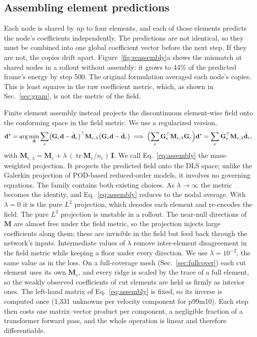 \documentclass[conf]{new-aiaa}
\newcommand{\dvec}{\mathbf{d}}
\newcommand{\dhat}{\hat{\mathbf{d}}}
\begin{document}
\subsection{Assembling element predictions}
\label{sec:assembly}
Each node is shared by up to four elements, and each of those elements predicts the node's coefficients independently. The predictions are not identical, so they must be combined into one global coefficient vector before the next step. If they are not, the copies drift apart. Figure~\ref{fig:reassembly}a shows the mismatch at shared nodes in a rollout without assembly: it grows to 44\% of the predicted frame's energy by step 500. The original formulation averaged each node's copies. This is least squares in the raw coefficient metric, which, as shown in Sec.~\ref{sec:gram}, is not the metric of the field.

Finite element assembly instead projects the discontinuous element-wise field onto the conforming space in the field metric. We use a regularized version,
\begin{equation}
  \dvec^{\star}=\arg\min_{\dvec}\sum_{e}\bigl(\mathbf{G}_e\dvec-\dhat_e\bigr)^{\top}\mathbf{M}_{e,\lambda}\bigl(\mathbf{G}_e\dvec-\dhat_e\bigr)
  \;\Longrightarrow\;
  \Bigl(\sum_{e}\mathbf{G}_e^{\top}\mathbf{M}_{e,\lambda}\mathbf{G}_e\Bigr)\dvec^{\star}=\sum_{e}\mathbf{G}_e^{\top}\mathbf{M}_{e,\lambda}\dhat_e,
  \label{eq:assembly}
\end{equation}
with $\mathbf{M}_{e,\lambda}=\mathbf{M}_e+\lambda\,(\operatorname{tr}\mathbf{M}_e/n_e)\,\mathbf{I}$. We call Eq.~\eqref{eq:assembly} the mass-weighted projection. It projects the predicted field onto the DLS space; unlike the Galerkin projection of POD-based reduced-order models, it involves no governing equations. The family contains both existing choices. As $\lambda\rightarrow\infty$ the metric becomes the identity, and Eq.~\eqref{eq:assembly} reduces to the nodal average. With $\lambda=0$ it is the pure $L^2$ projection, which decodes each element and re-encodes the field. The pure $L^2$ projection is unstable in a rollout. The near-null directions of $\mathbf{M}$ are almost free under the field metric, so the projection injects large coefficients along them; these are invisible in the field but feed back through the network's inputs. Intermediate values of $\lambda$ remove inter-element disagreement in the field metric while keeping a floor under every direction. We use $\lambda=10^{-2}$, the same value as in the loss. On a full-coverage mesh (Sec.~\ref{sec:fullcover}) each cut element uses its own $\mathbf{M}_e$, and every ridge is scaled by the trace of a full element, so the weakly observed coefficients of cut elements are held as firmly as interior ones. The left-hand matrix of Eq.~\eqref{eq:assembly} is fixed, so its inverse is computed once (1,331 unknowns per velocity component for p99m10). Each step then costs one matrix--vector product per component, a negligible fraction of a transformer forward pass, and the whole operation is linear and therefore differentiable.
\end{document}
